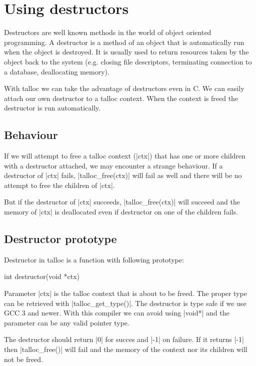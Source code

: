 \section{Using destructors}
\label{talloc:sec:destructors}

Destructors are well known methods in the world of object oriented programming.
A destructor is a method of an object that is automatically run when the object
is destroyed. It is usually used to return resources taken by the object back to
the system (e.g. closing file descriptors, terminating connection to a database,
deallocating memory).

With talloc we can take the advantage of destructors even in C. We can easily
attach our own destructor to a talloc context. When the context is freed the
destructor is run automatically.

\subsection{Behaviour}

If we will attempt to free a talloc context (|ctx|) that has one or more
children with a destructor attached, we may encounter a strange behaviour. If a
destructor of |ctx| fails, |talloc_free(ctx)| will fail as well and there will
be no attempt to free the children of |ctx|.

But if the destructor of |ctx| succeeds, |talloc_free(ctx)| will succeed and
the memory of |ctx| is deallocated even if destructor on one of the children
fails.

\subsection{Destructor prototype}

Destructor in talloc is a function with following prototype:

\begin{funcproto}
int destructor(void *ctx)
\end{funcproto}
\funclistend
Parameter |ctx| is the talloc context that is about to be freed. The proper type
can be retrieved with |talloc_get_type()|. The destructor is type safe if we
use GCC 3 and newer. With this compiler we can avoid  using |void*| and the
parameter can be any valid pointer type.

The destructor should return |0| for succes and |-1| on failure. If it returns
|-1| then |talloc_free()| will fail and the memory of the context nor its
children will not be freed.


